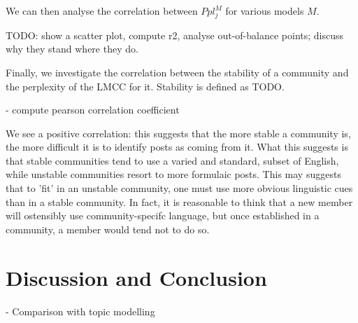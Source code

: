 \documentclass[11pt,a4paper]{article}
\begin{document}
We can then analyse the correlation between \(Ppl^M_j\) for various models $M$.

TODO: show a scatter plot, compute r2, analyse out-of-balance points; discuss why they stand where they do.


Finally, we investigate the correlation between the stability of a
community and the perplexity of the LMCC for it. Stability is defined as TODO.

- compute pearson correlation coefficient

We see a positive correlation: this suggests that the more stable a
community is, the more difficult it is to identify posts as coming
from it. What this suggests is that stable communities tend to use a
varied and standard, subset of English, while unstable communities
resort to more formulaic posts. This may suggests that to 'fit' in an
unstable community, one must use more obvious linguistic cues than in
a stable community. In fact, it is reasonable to think that a new
member will ostensibly use community-specifc language, but once
established in a community, a member would tend not to do so.

\section{Discussion and Conclusion}

- Comparison with topic modelling



\end{document}
